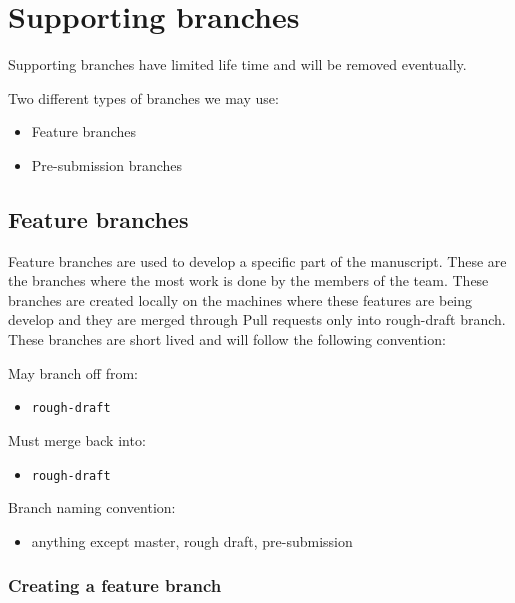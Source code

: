 \documentclass[]{book}
\providecommand{\tightlist}{%
  \setlength{\itemsep}{0pt}\setlength{\parskip}{0pt}}
\begin{document}
\section{Supporting branches}\label{supporting-branches}

Supporting branches have limited life time and will be removed
eventually.

Two different types of branches we may use:

\begin{itemize}
\tightlist
\item
  Feature branches
\item
  Pre-submission branches
\end{itemize}

\subsection{Feature branches}\label{feature-branches}

Feature branches are used to develop a specific part of the manuscript.
These are the branches where the most work is done by the members of the
team. These branches are created locally on the machines where these
features are being develop and they are merged through Pull requests
only into rough-draft branch. These branches are short lived and will
follow the following convention:

May branch off from:

\begin{itemize}
\tightlist
\item
  \texttt{rough-draft}
\end{itemize}

Must merge back into:

\begin{itemize}
\tightlist
\item
  \texttt{rough-draft}
\end{itemize}

Branch naming convention:

\begin{itemize}
\tightlist
\item
  anything except master, rough draft, pre-submission
\end{itemize}

\subsubsection{Creating a feature
branch}\label{creating-a-feature-branch}
\end{document}

